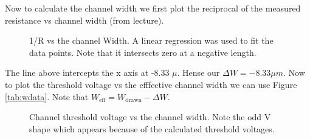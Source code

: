 \documentclass{article}
\begin{document}
Now to calculate the channel width we first plot the reciprocal of the measured resistance vs channel width (from lecture).
\begin{figure}[H]
\centering
{}
\caption{1/R vs the channel Width. A linear regression was used to fit the data points. Note that it intersects zero at a negative length.}
\end{figure}

The line above intercepts the x axis at -8.33 $\mu $. Hense our $\Delta W = -8.33\mu m$. Now to plot the threshold voltage vs the efffective channel width we can use Figure \textcolor{blue}{\ref{tab:wdata}}. Note that $W_{\text{eff}} = W_{\text{drawn}} - \Delta W$.

\begin{figure}[H]
\centering
{}
\caption{Channel threshold voltage vs the channel width. Note the odd V shape which appears because of the calculated threshold voltages.}
\end{figure}
\end{document}
